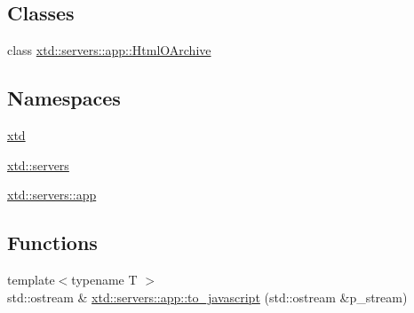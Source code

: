 \subsection*{Classes}
\begin{DoxyCompactItemize}
\item 
class \hyperlink{classxtd_1_1servers_1_1app_1_1HtmlOArchive}{xtd\+::servers\+::app\+::\+Html\+O\+Archive}
\end{DoxyCompactItemize}
\subsection*{Namespaces}
\begin{DoxyCompactItemize}
\item 
 \hyperlink{namespacextd}{xtd}
\item 
 \hyperlink{namespacextd_1_1servers}{xtd\+::servers}
\item 
 \hyperlink{namespacextd_1_1servers_1_1app}{xtd\+::servers\+::app}
\end{DoxyCompactItemize}
\subsection*{Functions}
\begin{DoxyCompactItemize}
\item 
{\footnotesize template$<$typename T $>$ }\\std\+::ostream \& \hyperlink{namespacextd_1_1servers_1_1app_afbe4f1864152231ae4e2be0b57509ab1}{xtd\+::servers\+::app\+::to\+\_\+javascript} (std\+::ostream \&p\+\_\+stream)
\end{DoxyCompactItemize}
